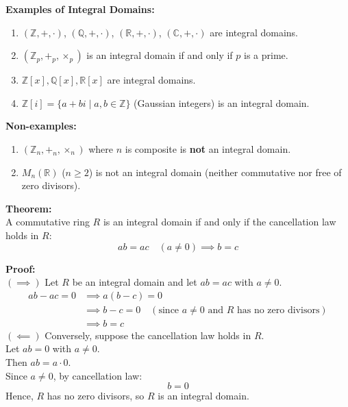 \documentclass[11pt]{article}
\begin{document}
\bigskip
\noindent \textbf{Examples of Integral Domains:}
\begin{enumerate}
    \item $(\mathbb{Z}, +, \cdot)$, $(\mathbb{Q}, +, \cdot)$, $(\mathbb{R}, +, \cdot)$, $(\mathbb{C}, +, \cdot)$ are integral domains.
    \item $(\mathbb{Z}_p, +_p, \times_p)$ is an integral domain if and only if $p$ is a prime.
    \item $\mathbb{Z}[x], \mathbb{Q}[x], \mathbb{R}[x]$ are integral domains.
    \item $\mathbb{Z}[i] = \{a + bi \mid a, b \in \mathbb{Z}\}$ (Gaussian integers) is an integral domain.
\end{enumerate}

\bigskip
\noindent \textbf{Non-examples:}
\begin{enumerate}
    \item $(\mathbb{Z}_n, +_n, \times_n)$ where $n$ is composite is \textbf{not} an integral domain.
    \item $M_n(\mathbb{R})$ ($n \ge 2$) is not an integral domain (neither commutative nor free of zero divisors).
\end{enumerate}

\bigskip
\noindent \textbf{Theorem:} \\
A commutative ring $R$ is an integral domain if and only if the cancellation law holds in $R$:
\[
ab = ac \quad (a \ne 0) \implies b = c
\]

\medskip
\noindent \textbf{Proof:} \\
$(\implies)$ Let $R$ be an integral domain and let $ab = ac$ with $a \ne 0$.
\begin{align*}
ab - ac = 0 &\implies a(b - c) = 0  \\
&\implies b - c = 0 \quad (\text{since } a \ne 0 \text{ and } R \text{ has no zero divisors})  \\
&\implies b = c
\end{align*}
$(\impliedby)$ Conversely, suppose the cancellation law holds in $R$. \\
Let $ab = 0$ with $a \ne 0$. \\
Then $ab = a \cdot 0$. \\
Since $a \ne 0$, by cancellation law:
\[
b = 0
\]
Hence, $R$ has no zero divisors, so $R$ is an integral domain.
\end{document}
